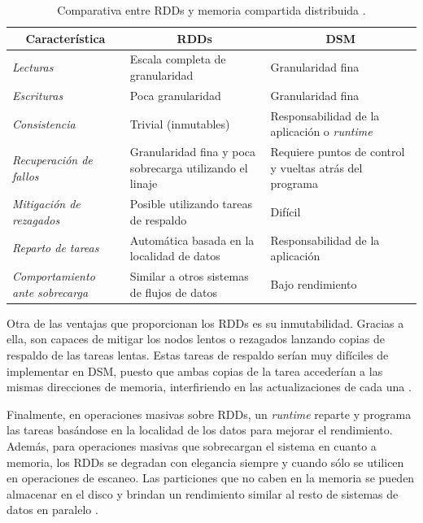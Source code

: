 \begin{table}[htbp!]
\begin{tabular}{|p{}|p{}|p{}|}
\hline
\multicolumn{1}{|c|}{\textbf{Característica}} & \multicolumn{1}{c|}{\textbf{RDDs}} & \multicolumn{1}{c|}{\textbf{DSM}} \\ \hline
\textit{Lecturas} & Escala completa de granularidad & Granularidad fina \\ \hline
\textit{Escrituras} & Poca granularidad & Granularidad fina \\ \hline
\textit{Consistencia} & Trivial (inmutables) & Responsabilidad de la aplicación o \textit{runtime} \\ \hline
\textit{Recuperación de fallos} & Granularidad fina y poca sobrecarga utilizando el linaje & Requiere puntos de control y vueltas atrás del programa \\ \hline
\textit{Mitigación de rezagados} & Posible utilizando tareas de respaldo & Difícil \\ \hline
\textit{Reparto de tareas} & Automática basada en la localidad de datos & Responsabilidad de la aplicación \\ \hline
\textit{Comportamiento ante sobrecarga} & Similar a otros sistemas de flujos de datos & Bajo rendimiento \\ \hline
\end{tabular}
\caption{Comparativa entre RDDs y memoria compartida distribuida \cite{rdds}.}
\label{tab:rdds}
\end{table}

\vspace{10pt}
Otra de las ventajas que proporcionan los RDDs es su inmutabilidad. Gracias a ella, son capaces de mitigar los nodos
lentos o rezagados lanzando copias de respaldo de las tareas lentas. Estas tareas de respaldo serían muy difíciles de
implementar en DSM, puesto que ambas copias de la tarea accederían a las mismas direcciones de memoria, interfiriendo
en las actualizaciones de cada una \cite{rdds}.

\vspace{10pt}
Finalmente, en operaciones masivas sobre RDDs, un \textit{runtime} reparte y programa las tareas basándose en la 
localidad de los datos para mejorar el rendimiento. Además, para operaciones masivas que sobrecargan el sistema en 
cuanto a memoria, los RDDs se degradan con elegancia siempre y cuando sólo se utilicen en operaciones de escaneo. Las 
particiones que no caben en la memoria se pueden almacenar en el disco y brindan un rendimiento similar al resto de 
sistemas de datos en paralelo \cite{rdds}.


